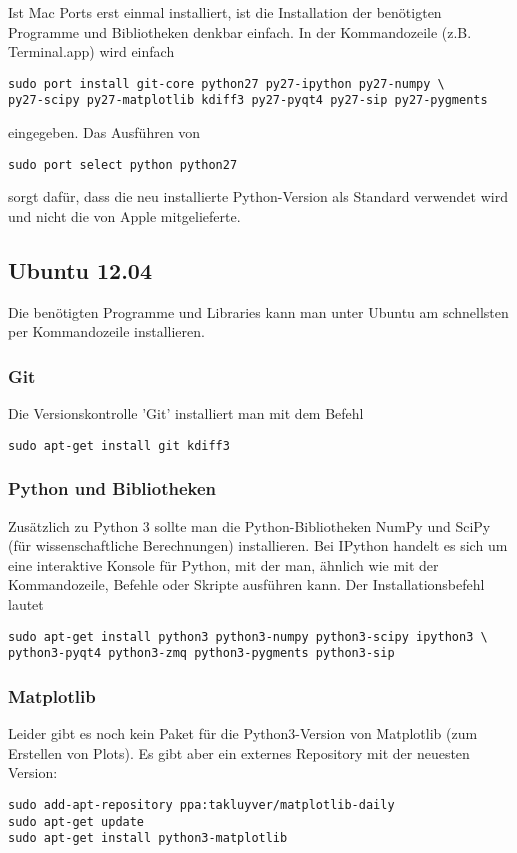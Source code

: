 Ist Mac Ports erst einmal installiert, ist die Installation der benötigten Programme und Bibliotheken denkbar einfach.
In der Kommandozeile (z.B. Terminal.app) wird einfach
\begin{verbatim}
sudo port install git-core python27 py27-ipython py27-numpy \
py27-scipy py27-matplotlib kdiff3 py27-pyqt4 py27-sip py27-pygments
\end{verbatim}
eingegeben.
Das Ausführen von
\begin{verbatim}
sudo port select python python27
\end{verbatim}
sorgt dafür, dass die neu installierte Python-Version als Standard verwendet wird und nicht die von Apple mitgelieferte.

\subsection{Ubuntu 12.04}
Die benötigten Programme und Libraries kann man unter Ubuntu am schnellsten per Kommandozeile installieren.

\subsubsection{Git}
Die Versionskontrolle 'Git' installiert man mit dem Befehl
\begin{verbatim}
sudo apt-get install git kdiff3
\end{verbatim}

\subsubsection{Python und Bibliotheken}
Zusätzlich zu Python 3 sollte man die Python-Bibliotheken NumPy und SciPy (für wissenschaftliche Berechnungen) installieren.
Bei IPython handelt es sich um eine interaktive Konsole für Python, mit der man, ähnlich wie mit der Kommandozeile, Befehle oder Skripte ausführen kann.
Der Installationsbefehl lautet
\begin{verbatim}
sudo apt-get install python3 python3-numpy python3-scipy ipython3 \
python3-pyqt4 python3-zmq python3-pygments python3-sip
\end{verbatim}

\subsubsection{Matplotlib}
Leider gibt es noch kein Paket für die Python3-Version von Matplotlib (zum Erstellen von Plots).
Es gibt aber ein externes Repository mit der neuesten Version:
\begin{verbatim}
sudo add-apt-repository ppa:takluyver/matplotlib-daily
sudo apt-get update
sudo apt-get install python3-matplotlib
\end{verbatim}

